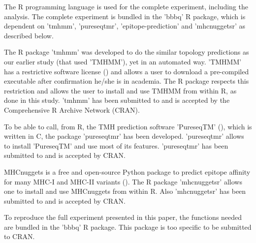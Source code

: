 The R programming language is used for the complete 
experiment, including the analysis.
The complete experiment is bundled in the 'bbbq' R package,
which is dependent on 'tmhmm', 'pureseqtmr', 
'epitope-prediction' and 'mhcnuggetsr'
as described below.


The R package 'tmhmm' was developed to do the similar topology
predictions as our earlier study (that used 'TMHMM'), yet in an automated way.
'TMHMM' has a restrictive software license (\cite{krogh2001predicting}) and allows a user
to download a pre-compiled executable after confirmation he/she
is in academia. The R package respects this restriction
and allows the user to install and use TMHMM from within R,
as done in this study.
'tmhmm' has been submitted to and is accepted 
by the Comprehensive R Archive Network (CRAN).


To be able to call, from R, the TMH prediction 
software 'PureseqTM' (\cite{wang2019efficient}),
which is written in C, the package 'pureseqtmr' has been developed. 
'pureseqtmr' allows to install 'PureseqTM' and use most of its features.
'pureseqtmr' has been submitted to and is accepted by CRAN.


MHCnuggets is a free and open-source Python package to predict 
epitope affinity for many MHC-I and MHC-II variants (\cite{shao2020high}).
The R package 'mhcnuggetsr' allows one to install and use MHCnuggets
from within R.
Also 'mhcnuggetsr' has been submitted to and is accepted by CRAN.


To reproduce the full experiment presented in this paper,
the functions needed are bundled in the 'bbbq' R package.
This package is too specific to be submitted to CRAN.

